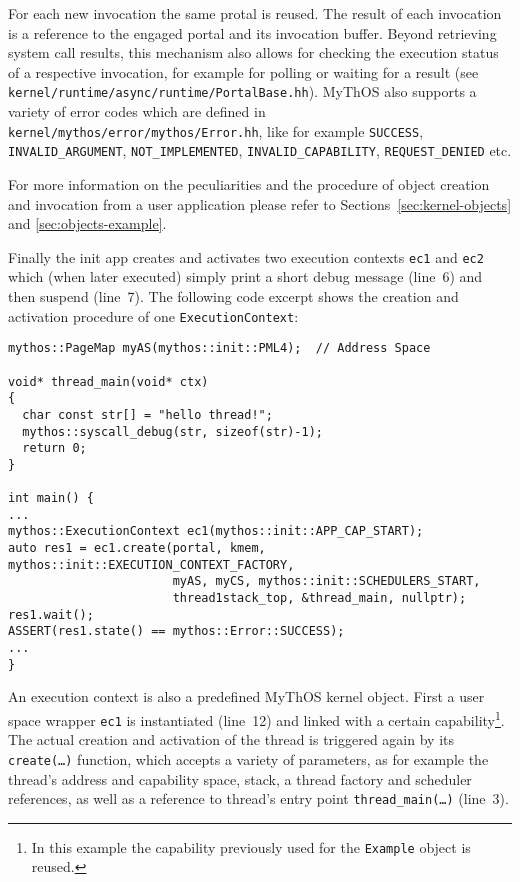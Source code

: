 \noindent For each new invocation the same protal is reused. The result of each
invocation is a reference to the engaged portal and its invocation buffer.
Beyond retrieving system call results, this mechanism also allows for checking
the execution status of a respective invocation, for example for polling or
waiting for a result (see \texttt{kernel/runtime/async/runtime/PortalBase.hh}).
MyThOS also supports a variety of error codes which are defined in
\texttt{kernel/mythos/error/mythos/Error.hh}, like for example \texttt{SUCCESS},
\texttt{INVALID\_ARGUMENT}, \texttt{NOT\_IMPLEMENTED},
\texttt{INVALID\_CAPABILITY}, \texttt{REQUEST\_DENIED} etc.

For more information on the peculiarities
and the procedure of object creation and invocation from a user application
please refer to Sections~\ref{sec:kernel-objects} and \ref{sec:objects-example}.
 
Finally the init app creates and activates two execution contexts \texttt{ec1}
and \texttt{ec2} which (when later executed) simply print a short debug message
(line~6) and then suspend (line~7). The following code excerpt shows the
creation and activation procedure of one \texttt{ExecutionContext}:
 
\lstset{language=c++}
\begin{lstlisting}
mythos::PageMap myAS(mythos::init::PML4);  // Address Space

void* thread_main(void* ctx)
{
  char const str[] = "hello thread!";
  mythos::syscall_debug(str, sizeof(str)-1);
  return 0;
}

int main() {
...
mythos::ExecutionContext ec1(mythos::init::APP_CAP_START);
auto res1 = ec1.create(portal, kmem, mythos::init::EXECUTION_CONTEXT_FACTORY,
                       myAS, myCS, mythos::init::SCHEDULERS_START,
                       thread1stack_top, &thread_main, nullptr);
res1.wait();
ASSERT(res1.state() == mythos::Error::SUCCESS);
...
}
\end{lstlisting}

An execution context is also a predefined MyThOS kernel object.
First a user space wrapper \texttt{ec1} is instantiated (line~12) and linked
with a certain capability\footnote{In this example the capability previously
used for the \texttt{Example} object is reused.}.
The actual creation and activation of the thread is triggered again by its
\texttt{create(\ldots)} function, which accepts a variety of parameters, as for
example the thread's address and capability space, stack, a thread factory and
scheduler references, as well as a reference to thread's entry point
\texttt{thread\_main(\ldots)} (line~3).


